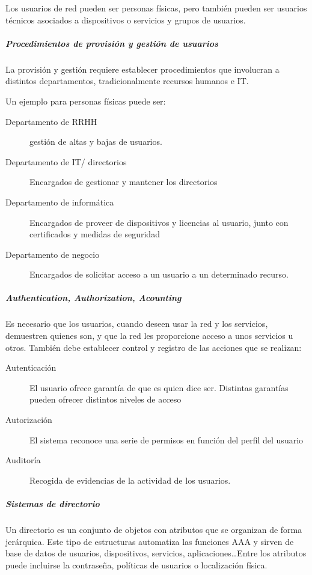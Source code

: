             Los usuarios de red pueden ser personas físicas, pero también pueden ser usuarios técnicos asociados a dispositivos o servicios y grupos de usuarios.

            \subparagraph{Procedimientos de provisión y gestión de usuarios} %
                La provisión y gestión requiere establecer procedimientos que involucran a distintos departamentos, tradicionalmente recursos humanos e IT.

                Un ejemplo para personas físicas puede ser:
                \begin{description}
                    \item[Departamento de RRHH] gestión de altas y bajas de usuarios.
                    \item[Departamento de IT/ directorios] Encargados de gestionar y mantener los directorios
                    \item[Departamento de informática] Encargados de proveer de dispositivos y licencias al usuario, junto con certificados y medidas de seguridad
                    \item[Departamento de negocio] Encargados de solicitar acceso a un usuario a un determinado recurso.
                \end{description}

            \subparagraph{Authentication, Authorization, Acounting} %
                Es necesario que los usuarios, cuando deseen usar la red y los servicios, demuestren quienes son, y que la red les proporcione acceso a unos servicios u otros. También debe establecer control y registro de las acciones que se realizan:
                \begin{description}
                    \item[Autenticación] El usuario ofrece garantía de que es quien dice ser. Distintas garantías pueden ofrecer distintos niveles de acceso
                    \item[Autorización] El sistema reconoce una serie de permisos en función del perfil del usuario
                    \item[Auditoría] Recogida de evidencias de la actividad de los usuarios.
                \end{description}

            \subparagraph{Sistemas de directorio} %
                Un directorio es un conjunto de objetos con atributos que se organizan de forma jerárquica. Este tipo de estructuras automatiza las funciones AAA y sirven de base de datos de usuarios, dispositivos, servicios, aplicaciones\dots Entre los atributos puede incluirse la contraseña, políticas de usuarios o localización física.

